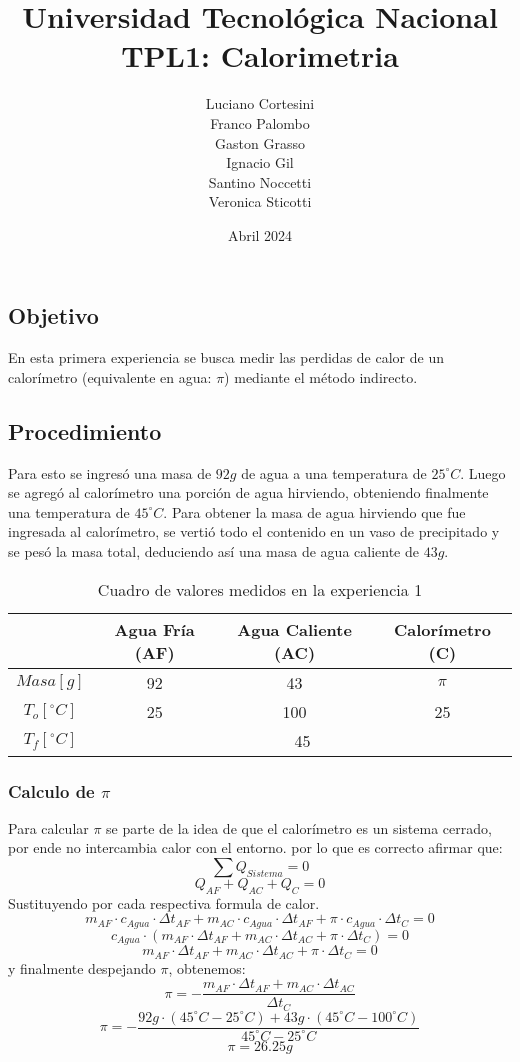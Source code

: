 \documentclass[12pt]{report}
\title{Universidad Tecnológica Nacional\\TPL1: Calorimetria}
\author{
Luciano Cortesini\\
Franco Palombo\\
Gaston Grasso\\
Ignacio Gil\\
Santino Noccetti\\
Veronica Sticotti
}
\date{Abril 2024}
\begin{document}
\maketitle

\chapter{}
\section{Objetivo}
En esta primera experiencia se busca medir las perdidas de calor de un calorímetro (equivalente en agua: $\pi$) mediante el método indirecto. 

\section{Procedimiento}
Para esto se ingresó una masa de $92 g$ de agua a una temperatura de $25^\circ C$.
Luego se agregó al calorímetro una porción de agua hirviendo, obteniendo finalmente una temperatura de  $45^\circ C$. 
Para obtener la masa de agua hirviendo que fue ingresada al calorímetro, se vertió todo el contenido en un vaso de precipitado y se pesó la masa total, deduciendo así una masa de agua caliente de $43g$.
\begin{table}[htbp]
    \centering
    \begin{tabular}{|c|c|c|c|}
    \hline
    & Agua Fría (AF) & Agua Caliente (AC) & Calorímetro (C)\\
    \hline
    $Masa[g]$ & 92 & 43 & $\pi$ \\
    \hline
   $T_o[^\circ C]$ & 25 & 100 & 25\\
    \hline
     $T_f[^\circ C]$ & \multicolumn{3}{|c|}{45}\\
    \hline
    \end{tabular}
    \caption{Cuadro de valores medidos en la experiencia 1}
    \label{tab:datos experiencia 1}
\end{table}
\subsection{Calculo de $\pi$}
Para calcular $\pi$ se parte de la idea de que el calorímetro es un sistema cerrado, por ende no intercambia calor con el entorno. por lo que es correcto afirmar que:
$$\sum Q_{Sistema}= 0$$
$$Q_{AF} + Q_{AC} + Q_{C} = 0$$
\hspace{1cm} Sustituyendo por cada respectiva formula de calor.
$$m_{AF} \cdot c_{Agua} \cdot {\Delta t}_{AF} + m_{AC} \cdot c_{Agua} \cdot {\Delta t}_{AF} + \pi \cdot c_{Agua} \cdot {\Delta t}_{C} = 0$$
$$c_{Agua} \cdot (m_{AF}  \cdot {\Delta t}_{AF} + m_{AC} \cdot {\Delta t}_{AC} + \pi \cdot {\Delta t}_C) = 0$$
$$m_{AF} \cdot  {\Delta t}_{AF} + m_{AC} \cdot  {\Delta t}_{AC} + \pi \cdot {\Delta t}_C= 0$$
\hspace{1cm} y finalmente despejando $\pi$, obtenemos:
$$\pi =-\frac{m_{AF} \cdot  {\Delta t}_{AF} + m_{AC} \cdot  {\Delta t}_{AC}}{{\Delta t}_C}$$
$$\pi =-\frac{92g \cdot (45^\circ C-25^\circ C)+ 43g \cdot (45^\circ C-100^\circ C)}{45^\circ C-25^\circ C}$$
$$\pi = 26.25g$$
\end{document}
